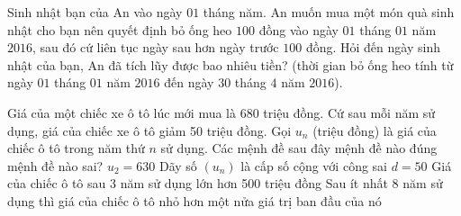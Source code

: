 \begin{bt}%

	Sinh nhật bạn của An vào ngày $01$ tháng năm. An muốn mua một món quà sinh nhật cho bạn nên quyết định bỏ ống heo $100$ đồng vào ngày $01$ tháng $01$ năm $2016$, sau đó cứ liên tục ngày sau hơn ngày trước $100$ đồng. Hỏi đến ngày sinh nhật của bạn, An đã tích lũy được bao nhiêu tiền? (thời gian bỏ ống heo tính từ ngày $01$ tháng $01$ năm $2016$ đến ngày $30$ tháng $4$ năm $2016$).
\end{bt}

\begin{ex}%
 
	Giá của một chiếc xe ô tô lúc mới mua là 680 triệu đồng. Cứ sau mỗi năm sử dụng, giá của chiếc xe ô tô giảm 50 triệu đồng. Gọi $u_n$ (triệu đồng) là giá của chiếc ô tô trong năm thứ $n$ sử dụng. Các mệnh đề sau đây mệnh đề nào đúng mệnh đề nào sai?
	\choiceTF
	{\True $ u_2=630$}
	{Dãy số $( u_n )$ là cấp số cộng với công sai $ d=50$}
	{\True Giá của chiếc ô tô sau 3 năm sử dụng lớn hơn 500 triệu đồng}
	{Sau ít nhất 8 năm sử dụng thì giá của chiếc ô tô nhỏ hơn một nửa giá trị ban đầu của nó}
\end{ex}

